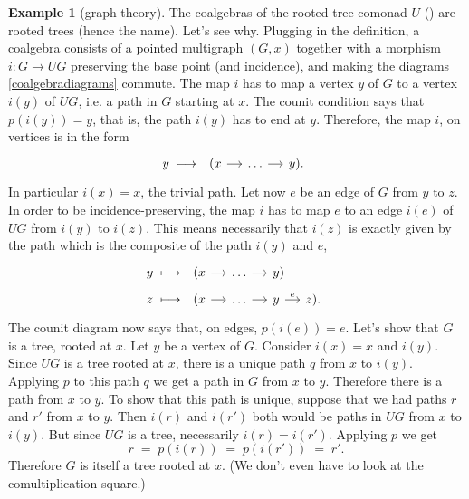 \documentclass[a4paper,11pt,oneside]{scrbook}
\numberwithin{equation}{section}
\theoremstyle{plain}
\theoremstyle{definition}
\newtheorem{eg}[thm]{Example}
\newcommand{\ar}[2][]{\arrow{#2}{#1}}
\DeclareMathOperator{\1}{\mathbbm{1}}
\DeclareMathOperator{\2}{\mathbbm{2}}
\begin{document}
\begin{eg}[graph theory]\label{rootedtrees}
 The coalgebras of the rooted tree comonad $U$ () are rooted trees (hence the name). 
 Let's see why. Plugging in the definition, a coalgebra consists of a pointed multigraph $(G,x)$ together with a morphism $i:G\to UG$ preserving the base point (and incidence), and making the diagrams \eqref{coalgebradiagrams} commute. The map $i$ has to map a vertex $y$ of $G$ to a vertex $i(y)$ of $UG$, i.e. a path in $G$ starting at $x$. The counit condition says that $p(i(y))=y$, that is, the path $i(y)$ has to end at $y$. Therefore, the map $i$, on vertices is in the form 
 $$
 y \;\longmapsto\; 
 \begin{tikzcd}[sep=small]
  (x \ar{r} &\dots \ar{r} & y ) .
 \end{tikzcd}
 $$
 In particular $i(x)=x$, the trivial path.
 Let now $e$ be an edge of $G$ from $y$ to $z$. In order to be incidence-preserving, the map $i$ has to map $e$ to an edge $i(e)$ of $UG$ from $i(y)$ to $i(z)$. This means necessarily that $i(z)$ is exactly given by the path which is the composite of the path $i(y)$ and $e$,
 \begin{align*}
 y \;&\longmapsto\; 
 \begin{tikzcd}[ampersand replacement=\&, sep=small]
  (x \ar{r} \&\dots \ar{r} \& y )   
 \end{tikzcd} \\
   z \;&\longmapsto\; 
 \begin{tikzcd}[ampersand replacement=\&, sep=small]
  (x \ar{r} \&\dots \ar{r} \& y \ar{r}{e} \& z ) .   
 \end{tikzcd}
 \end{align*}
 The counit diagram now says that, on edges, $p(i(e))=e$.
 Let's show that $G$ is a tree, rooted at $x$. Let $y$ be a vertex of $G$. Consider $i(x)=x$ and $i(y)$. Since $UG$ is a tree rooted at $x$, there is a unique path $q$ from $x$ to $i(y)$. Applying $p$ to this path $q$ we get a path in $G$ from $x$ to $y$. Therefore there is a path from $x$ to $y$. To show that this path is unique, suppose that we had paths $r$ and $r'$ from $x$ to $y$. 
 Then $i(r)$ and $i(r')$ both would be paths in $UG$ from $x$ to $i(y)$. But since $UG$ is a tree, necessarily $i(r)=i(r')$. Applying $p$ we get 
 $$
 r \;=\; p(i(r)) \;=\; p(i(r')) \;=\; r' .
 $$
 Therefore $G$ is itself a tree rooted at $x$. 
 (We don't even have to look at the comultiplication square.)
 

\end{eg}
\end{document}
